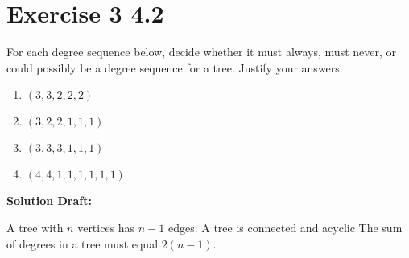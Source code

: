 \documentclass{article}
\begin{document}
\section*{Exercise 3 4.2}  

For each degree sequence below, decide whether it must always, must never, or could possibly be a degree sequence for a tree.  Justify your answers.%
\begin{enumerate}[label= (\alph*)]
\item{}\(\displaystyle (3, 3, 2, 2, 2)\)%
\item{}\(\displaystyle (3, 2, 2, 1, 1, 1)\)%
\item{}\(\displaystyle (3, 3, 3, 1, 1, 1)\)%
\item{}\(\displaystyle (4, 4, 1, 1, 1, 1, 1, 1)\)%
\end{enumerate}

\vspace{0.5cm}
\noindent\textbf{Solution Draft:} 
\vspace{0.2cm}

A tree with $n$ vertices has $n-1$ edges.
A tree is connected and acyclic
The sum of degrees in a tree must equal $2(n-1)$.
\end{document}

